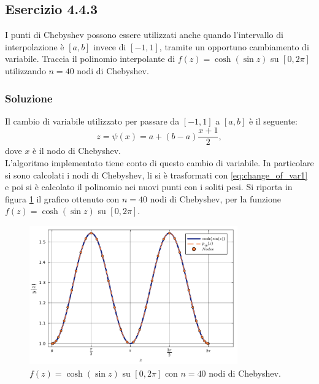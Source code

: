 \documentclass[letterpaper, 12pt]{article}
\begin{document}
\subsection{Esercizio 4.4.3}
I punti di Chebyshev possono essere utilizzati anche quando l'intervallo di interpolazione è $[a,b]$ 
invece di $[-1,1]$, tramite un opportuno cambiamento di variabile. 
Traccia il polinomio interpolante di $f(z) = \cosh(\sin z)$ su $[0,2\pi]$ utilizzando $n=40$ nodi di Chebyshev.

\subsubsection{Soluzione}
Il cambio di variabile utilizzato per passare da $[-1,1]$ a $[a,b]$ è il seguente:
\begin{equation}
    \label{eq:change_of_var1}
    z = \psi(x) = a + (b-a) \frac{x+1}{2},
\end{equation}
dove $x$ è il nodo di Chebyshev. \\
L'algoritmo implementato tiene conto di questo cambio di variabile. In particolare si sono calcolati i nodi 
di Chebyshev, li si è trasformati con \ref{eq:change_of_var1} e poi si è calcolato il polinomio nei nuovi punti con 
i soliti pesi. Si riporta in figura \ref{fig:es4_4_3_1} 
il grafico ottenuto con $n=40$ nodi di Chebyshev, per la funzione $f(z) = \cosh(\sin z)$ su $[0,2\pi]$.
\begin{figure}[!ht]
    \centering
    \includegraphics[width=0.8\textwidth]{4431.pdf}
    \caption{$f(z) = \cosh(\sin z)$ su $[0,2\pi]$ con $n=40$ nodi di Chebyshev.}
    \label{fig:es4_4_3_1}
\end{figure}
\end{document}
